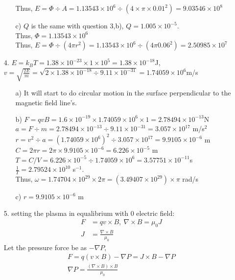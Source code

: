 \documentclass{article}
\begin{document}
\begin{itemize}
\begin{itemize}
    Thus, \(E = \Phi\div A = 1.13543 \times 10^{6} \div (4\times\pi\times0.01^2)=9.03546\times10^{8}\)
    \item [c)] \(Q\) is the same with question 3,b), \(Q = 1.005 \times 10^{-5}\).\\Thus, \(\Phi = 1.13543 \times 10^{6}\)
    \\Thus, \(E = \Phi\div (4\pi r^2 ) = 1.13543 \times 10^{6}\div(4\pi 0.06^2)=2.50985 \times 10^7\)
\end{itemize}
\newpage
\item[4.] \(E = k_BT = 1.38\times10^{-23}\times 1\times10^5 = 1.38\times10^{-18}\)J,\\
\(v = \sqrt{\frac{2E}{m}} = \sqrt{2\times1.38\times10^{-18}\div9.11\times10^{-31}}=1.74059\times 10^{6}\)m/s
\begin{itemize}
    \item [a)] It will start to do circular motion in the surface perpendicular to the magnetic field line's.
    \item [b)] \(F = qvB = 1.6\times 10^{-19}\times1.74059\times 10^{6}\times 1 = 2.78494\times10^{-13}\)N\\
                \(a=F\div m = 2.78494\times10^{-13}\div 9.11\times 10^{-31} = 3.057\times 10^{17}\) m/s\(^2\)
                \(r = v^2 \div a = (1.74059\times 10^{6})^2\div 3.057\times 10^{17} = 9.9105\times 10^{-6}\) m
            \\  \(C = 2\pi r = 2\pi\times9.9105\times 10^{-6}=6.226\times10^{-5}\) m
            \\  \(T = C/V = 6.226\times10^{-5}\div1.74059\times 10^{6}=3.57751\times10^{-11}\)s 
            \\  \(\frac{1}{T}=2.79524\times10^{10}\) s\(^{-1}\).
            \\  Thus, \(\omega = 1.74704\times 10^{29}\times 2\pi = (3.49407\times 10^{29})\times \pi\) rad/s
    \item [c)]\(r = 9.9105\times 10^{-6}\) m
\end{itemize}
\item[5.]setting the plasma in equalibrium with 0 electric field:
\begin{align*}
    F &= qv\times B, \ \nabla \times B = \mu_0 J\\
    J &=\frac{\nabla \times B}{\mu_0}
\end{align*}
Let the pressure force be as \(-\nabla P\),
\begin{align*}
    F = q(v\times B)-\nabla P = J\times B- \nabla P\\
    \nabla P = \frac{(\nabla \times B)\times B}{\mu_0}\\

\end{align*}
\end{itemize}
\end{document}
